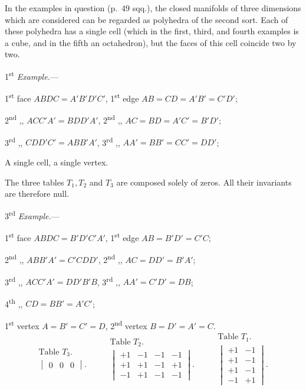 \documentclass{article}
\begin{document}
In the examples in question (p.\ 49 sqq.), the closed manifolds of
three dimensions which are considered can be regarded as polyhedra of the second sort. Each of these polyhedra has a single cell (which in the first, third, and fourth examples is a cube, and in the fifth an octahedron), but the faces of this cell coincide two by two.

1\textsuperscript{st} \emph{Example.}---

1\textsuperscript{st} face $ABDC = A'B'D'C'$, 1\textsuperscript{st} edge $AB = CD = A'B' = C'D'$;

2\textsuperscript{nd} ,, $ACC'A' = BDD'A'$, 2\textsuperscript{nd} ,, $AC = BD = A'C' = B'D'$;

3\textsuperscript{rd} ,, $CDD'C' = ABB'A'$, 3\textsuperscript{rd} ,, $AA' = BB' = CC' = DD'$;

A single cell, a single vertex.

The three tables $T_{1}, T_{2}$ and $T_{3}$ are composed solely of zeros. All their invariants are therefore null.

3\textsuperscript{rd} \emph{Example.}---

1\textsuperscript{st} face $ABDC = B'D'C'A'$, 1\textsuperscript{st} edge $AB = B'D' = C'C$;

2\textsuperscript{nd} ,, $ABB'A' = C'CDD'$, 2\textsuperscript{nd} ,, $AC = DD' = B'A'$;

3\textsuperscript{rd} ,, $ACC'A' = DD'B'B$, 3\textsuperscript{rd} ,, $AA' = C'D' = DB$;

4\textsuperscript{th} ,, $CD = BB' = A'C'$;

1\textsuperscript{st} vertex $A = B' = C' = D$, 2\textsuperscript{nd} vertex $B = D' = A' = C$.
\[ \begin{gathered} \text{Table } T_{3}. \\ \begin{vmatrix} 0 & 0 & 0 \end{vmatrix}. \end{gathered} \qquad \begin{gathered} \text{Table } T_{2}. \\ \begin{vmatrix} +1 & -1 & -1 & -1 \\[1ex] +1 & +1 & -1 & +1 \\[1ex] -1 & +1 & -1 & -1 \end{vmatrix}. \end{gathered} \qquad \begin{gathered} \text{Table } T_{1}. \\ \begin{vmatrix} +1 & -1 \\[1ex] +1 & -1 \\[1ex] +1 & -1 \\[1ex] -1 & +1 \end{vmatrix}. \end{gathered} \]
\end{document}
